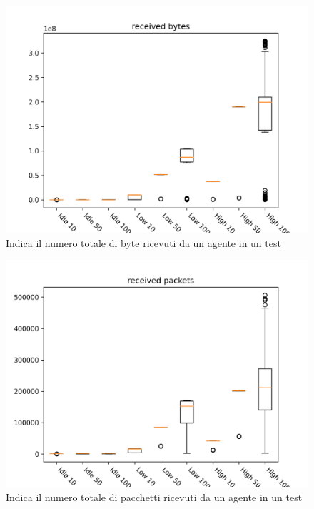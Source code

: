 \documentclass[target=bach]{thud}
\begin{document}
\begin{figure}[H]
    \includegraphics[width=\linewidth, height=0.4\textheight, keepaspectratio]{graphs/received bytes.png}
    \caption{Indica il numero totale di byte ricevuti da un agente in un test}
    \label{fig:rb}
\end{figure}

\begin{figure}[H]
    \includegraphics[width=\linewidth, height=0.4\textheight, keepaspectratio]{graphs/received packets.png}
    \caption{Indica il numero totale di pacchetti ricevuti da un agente in un test}
    \label{fig:rp}
\end{figure}
\end{document}
